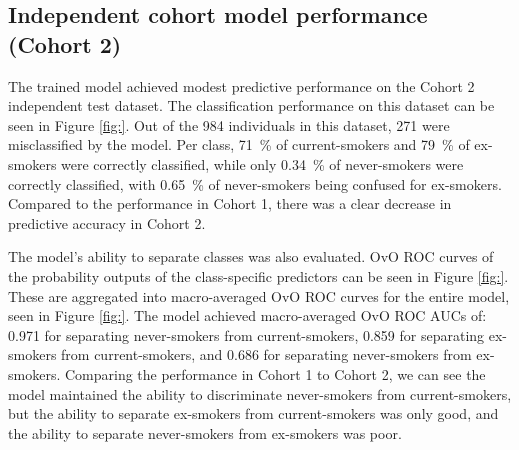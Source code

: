 \documentclass[draft]{article}
\begin{document}


\subsection{Independent cohort model performance (Cohort 2)} \label{sec:cohort2-performance}
The trained model achieved modest predictive performance on the Cohort 2 independent test dataset. The classification performance on this dataset can be seen in Figure \ref{fig:}. Out of the 984 individuals in this dataset, 271 were misclassified by the model. Per class, \SI{71}{\percent} of current-smokers and \SI{79}{\percent} of ex-smokers were correctly classified, while only \SI{0.34}{\percent} of never-smokers were correctly classified, with \SI{0.65}{\percent} of never-smokers being confused for ex-smokers. Compared to the performance in Cohort 1, there was a clear decrease in predictive accuracy in Cohort 2. 

The model's ability to separate classes was also evaluated. OvO ROC curves of the probability outputs of the class-specific predictors can be seen in Figure \ref{fig:}. These are aggregated into macro-averaged OvO ROC curves for the entire model, seen in Figure \ref{fig:}. The model achieved macro-averaged OvO ROC AUCs of: 0.971 for separating never-smokers from current-smokers, 0.859 for separating ex-smokers from current-smokers, and 0.686 for separating never-smokers from ex-smokers. Comparing the performance in Cohort 1 to Cohort 2, we can see the model maintained the ability to discriminate never-smokers from current-smokers, but the ability to separate ex-smokers from current-smokers was only good, and the ability to separate never-smokers from ex-smokers was poor. 
\end{document}
